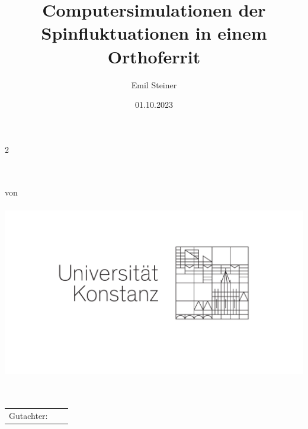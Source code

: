 

\usepackage{subfiles} %

\newcommand{\thesisTitle}{
\begin{sffamily}
\centering
\Huge\textbf{\docTitle}\\
\vspace{4em}
\huge\textbf{\docThesisType}\\
\centering von\\
\Large\textbf{\docAuthor}\\
\includegraphics[width=\textwidth]{bilder/logo/UniKonstanz_Logo_Optimum.pdf}\\
\Large\docUnisection\\
\Large\docDepartment\\
\vspace{3em}
\centering\begin{tabular}{lll}%
Gutachter: & & \docSupervisorOne\\
\end{tabular}\\
\end{sffamily}
}%


\date{01.10.2023}
\author{Emil Steiner}
\title{Computersimulationen der Spinfluktuationen in einem Orthoferrit}
\subtitle{}



2
\thesisTitle
\thispagestyle{empty}
\newpage

